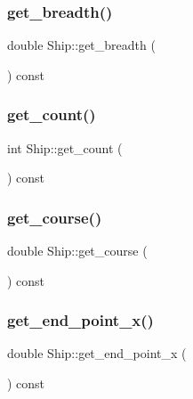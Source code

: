\mbox{\label{class_ship_a7fcbd35c60b95c56e7f963709cbefc26}} 
\subsubsection{\texorpdfstring{get\_breadth()}{get\_breadth()}}
{\footnotesize\ttfamily double Ship\+::get\+\_\+breadth (\begin{DoxyParamCaption}{ }\end{DoxyParamCaption}) const}

\mbox{\label{class_ship_aa0706edc7c2ab74ec335088d5fb89337}} 
\subsubsection{\texorpdfstring{get\_count()}{get\_count()}}
{\footnotesize\ttfamily int Ship\+::get\+\_\+count (\begin{DoxyParamCaption}{ }\end{DoxyParamCaption}) const}

\mbox{\label{class_ship_abe76a5439f140ce8c8819bcdebe6d2a8}} 
\subsubsection{\texorpdfstring{get\_course()}{get\_course()}}
{\footnotesize\ttfamily double Ship\+::get\+\_\+course (\begin{DoxyParamCaption}{ }\end{DoxyParamCaption}) const}

\mbox{\label{class_ship_a42817642d3c98dc0c73b1e59cf6f4ede}} 
\subsubsection{\texorpdfstring{get\_end\_point\_x()}{get\_end\_point\_x()}}
{\footnotesize\ttfamily double Ship\+::get\+\_\+end\+\_\+point\+\_\+x (\begin{DoxyParamCaption}{ }\end{DoxyParamCaption}) const}


